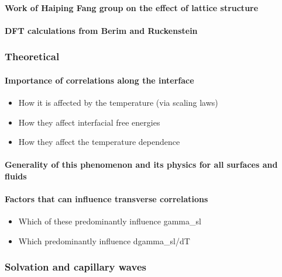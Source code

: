 \documentclass[a4paper,12pt,single,pdftex]{article}
\begin{document}
\label{ID_1854553780}\paragraph{Work of Haiping Fang group on the effect of lattice structure}

\label{ID_314119525}\paragraph{DFT calculations from Berim and Ruckenstein}

\label{ID_1942058277}\subsubsection{Theoretical}

\label{ID_1905060815}\paragraph{Importance of correlations along the interface}

\begin{itemize}
\label{ID_801342251}\item How it is affected by the temperature (via scaling laws)
\label{ID_1964284085}\item How they affect interfacial free energies
\label{ID_751345006}\item How they affect the temperature dependence
\end{itemize}
\label{ID_801342251}\label{ID_1964284085}\label{ID_751345006}\label{ID_1590536878}\paragraph{Generality of this phenomenon and its physics for all surfaces and fluids}

\label{ID_398274930}\paragraph{Factors that can influence transverse correlations}

\begin{itemize}
\label{ID_580082896}\item Which of these predominantly influence gamma_sl
\label{ID_874559696}\item Which predominantly influence dgamma_sl/dT
\end{itemize}
\label{ID_580082896}\label{ID_874559696}\label{ID_19652608}\subsubsection{Solvation and capillary waves}
\end{document}
